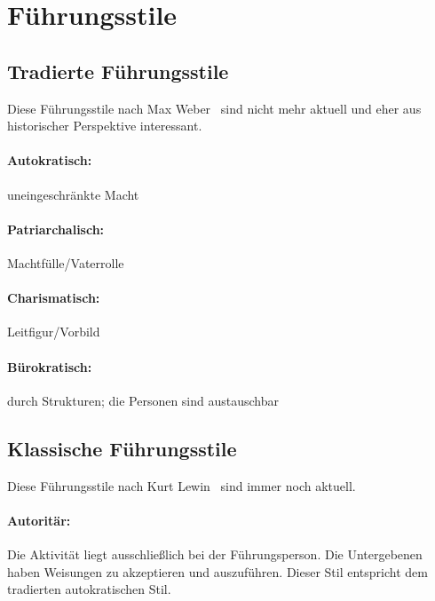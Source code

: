 \section{Führungsstile}
\label{fuehrungsstile}

\subsection{Tradierte Führungsstile}

Diese Führungsstile nach Max Weber~\cite{weber-wirtschaft-gesellschaft} sind nicht mehr aktuell und eher aus historischer Perspektive interessant.

\paragraph{Autokratisch:} uneingeschränkte Macht

\paragraph{Patriarchalisch:} Machtfülle/Vaterrolle

\paragraph{Charismatisch:} Leitfigur/Vorbild

\paragraph{Bürokratisch:} durch Strukturen; die Personen sind austauschbar

\subsection{Klassische Führungsstile}

Diese Führungsstile nach Kurt Lewin~\cite{lewin-fuehrungsstile} sind immer noch aktuell.

\paragraph{Autoritär:} Die Aktivität liegt ausschließlich bei der Führungsperson. Die \glqq Untergebenen\grqq{} haben Weisungen zu akzeptieren und auszuführen. Dieser Stil entspricht dem tradierten autokratischen Stil.


